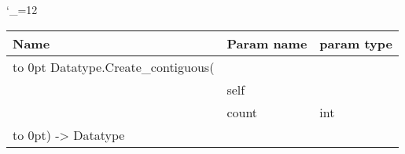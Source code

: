 \begingroup \catcode`\_=12 \tt
\begin{tabular}{lll}
\toprule
\textrm{Name}&\textrm{Param name}&\textrm{param type}\\
\midrule
\hbox to 0pt {Datatype.Create_contiguous(\hss}\\
& self\\
& count & int\\
\hbox to 0pt{) -> Datatype\hss}\\
\bottomrule
\end{tabular}
\endgroup
